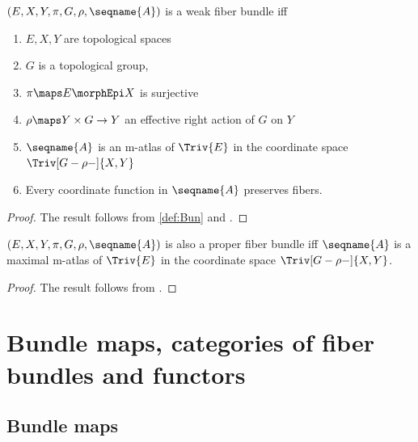 \documentclass{article}
\begin{document}
\begin{lemma}
\label{lem:Bun}
$(E, X, Y, \pi, G, \rho, \seqname{A})$ is a weak fiber bundle iff

\begin{enumerate}
\item
$E,X,Y$ are topological spaces

\item
$G$ is a topological group,

\item
$\pi \maps E \morphEpi X$ is surjective

\item
$\rho \maps Y \times G \to Y$ an effective right action of $G$ on $Y$

\item
$\seqname{A}$ is an m-atlas of $\Triv{E}$ in the coordinate space
$\Triv[G-\rho-]{X,Y}$

\item
Every coordinate function in $\seqname{A}$ preserves fibers.
\end{enumerate}

\begin{proof}
The result follows from \cref{def:Bun} and .
\end{proof}

$(E, X, Y, \pi, G, \rho, \seqname{A})$ is also a proper fiber bundle iff
$\seqname{A}$ is a maximal m-atlas of $\Triv{E}$ in the coordinate space
$\Triv[G-\rho-]{X,Y}$.

\begin{proof}
The result follows from .
\end{proof}
\end{lemma}

\section{Bundle maps, categories of fiber bundles and functors}
\label{sec:Bunmap}

\subsection{Bundle maps}
\label{sub:Bunmap}
\end{document}
